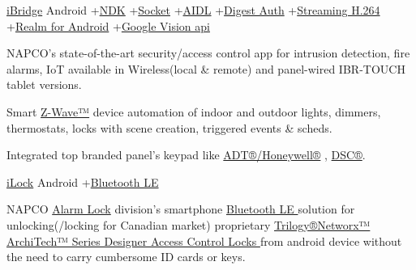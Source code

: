 

\begin{projectentries}

  \projectentry 
    {\href{http://www.napcosecurity.com/products/ibridge/}{iBridge}}
    {Android
    +{\href{https://developer.android.com/ndk/}{NDK}}
    +{\href{https://www.geeksforgeeks.org/socket-programming-in-java/}{Socket}}
    +{\href{https://developer.android.com/guide/components/aidl}{AIDL}}
    +{\href{https://searchsecurity.techtarget.com/definition/digest-authentication}{Digest Auth}}
    +{\href{https://developer.android.com/guide/topics/media/}{Streaming H.264}}
    +{\href{https://realm.io/docs/java/0.82.2/}{Realm for Android}}
    +{\href{https://developers.google.com/vision/android/barcodes-overview}{Google Vision api}} }
    {
      \begin{projectitems} %
        \item {NAPCO's state-of-the-art security/access control app for intrusion detection, fire alarms, IoT 
        available in Wireless(local \& remote) and panel-wired IBR-TOUCH tablet versions.}
        \item {Smart 
        {\href{https://www.z-wave.com/shop-z-wave-smart-home-products/smart-hubs-napco-napco-i-bridge-z-wave-controller}{Z-Wave™}}
         device automation of indoor and outdoor lights, dimmers, thermostats, locks with scene creation, triggered events \& scheds.}
        \item {Integrated top branded panel's keypad like 
        {\href{https://www.security.honeywell.com/product-repository/6160v}{ADT®/Honeywell®}}
        , {\href{http://www.dsc.com/index.php?n=products&o=view&id=60}{DSC®}}.}
      \end{projectitems}
    }
    
    \projectentry 
    {\href{https://play.google.com/store/apps/details?id=com.napcosecurity.android.ilock&hl=en}{iLock}}
    {Android
    +{\href{https://developer.android.com/guide/components/aidl}{Bluetooth LE}}}
    {
      \begin{projectitems} %
        \item {NAPCO 
        {\href{http://www.alarmlock.com}{Alarm Lock}}
        division's smartphone 
        {\href{https://developer.android.com/guide/components/aidl}{Bluetooth LE }}
        solution for unlocking(/locking for Canadian market) proprietary 
        {\href{http://www.alarmlock.com}{Trilogy®Networx™ ArchiTech™ Series Designer Access Control Locks }} 
        from android device without the need to carry cumbersome ID cards or keys.}
      \end{projectitems}
    }
    

\end{projectentries}
